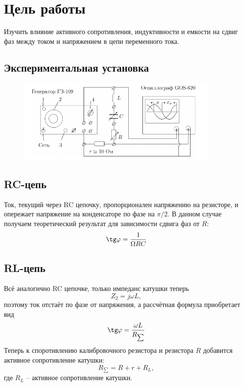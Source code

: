 \documentclass[a4paper, 12pt]{article}
\begin{document}
\section{Цель работы}
Изучить влияние активного сопротивления, индуктивности и емкости на сдвиг фаз между током и напряжением в цепи переменного тока.

\subsection*{Экспериментальная установка}



\begin {figure}[H]
\begin{center}
\includegraphics[width=0.9\textwidth]{t}
\end{center}
\end {figure}


\subsection*{RC-цепь}


Ток, текущий через RC цепочку, пропорционален напряжению на резисторе, и опережает напряжение на конденсаторе по фазе на $\pi/2$. В данном случае получаем теоретический результат для зависимости сдвига фаз от $R$:
$$\tg \varphi = \frac{1}{\Omega R C}$$

\subsection*{RL-цепь}

Всё аналогично RC цепочке, только импеданс катушки теперь 
$$Z_2 = j\omega L,$$
поэтому ток отстаёт по фазе от напряжения, а рассчётная формула приобретает вид
$$\tg \varphi = \frac{\omega L}{R_{\sum}}$$
Теперь к споротивлению калибровочного резистора и резистора $R$ добавится активное сопротивление катушки:
$$R_{\sum} = R+r+R_L,$$
где $R_L$ -- активное сопротивление катушки.
\end{document}
